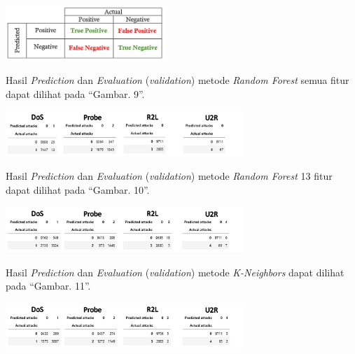 \documentclass[conference]{IEEEtran}
\begin{document}
\begin{minipage}{\linewidth}
\centerline{\includegraphics[width=60mm]{Gambar/Gbr005.jpg}}
\label{fig8}
\end{minipage}
\vspace{6pt}


Hasil \emph{Prediction} dan \emph{Evaluation} (\emph{validation})
metode \emph{Random Forest} semua fitur dapat dilihat
pada ``Gambar. 9''.

\begin{minipage}{\linewidth}
\centerline{\includegraphics[width=90mm]{Gambar/Gbr006.jpg}}
\label{fig9}
\end{minipage}
\vspace{6pt}

Hasil \emph{Prediction} dan \emph{Evaluation} (\emph{validation})
metode \emph{Random Forest} 13 fitur dapat dilihat
pada ``Gambar. 10''.

\begin{minipage}{\linewidth}
\centerline{\includegraphics[width=90mm]{Gambar/Gbr007.jpg}}
\label{fig10}
\end{minipage}
\vspace{6pt}

Hasil \emph{Prediction} dan \emph{Evaluation} (\emph{validation})
metode \emph{K-Neighbors} dapat dilihat
pada ``Gambar. 11''.

\begin{minipage}{\linewidth}
\centerline{\includegraphics[width=90mm]{Gambar/Gbr008.jpg}}
\label{fig11}
\end{minipage}
\vspace{6pt}
\end{document}

